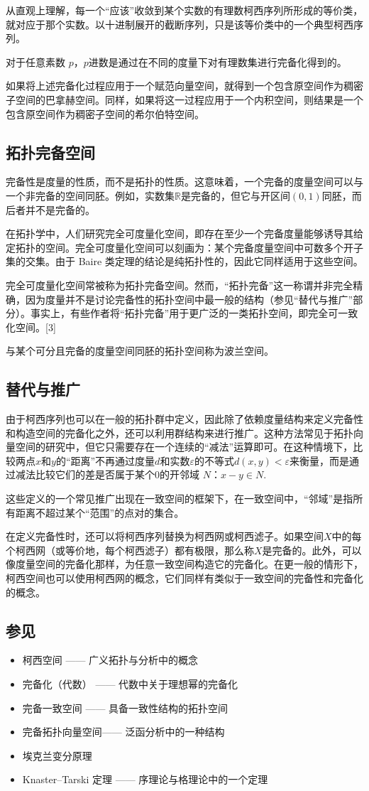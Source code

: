 从直观上理解，每一个“应该”收敛到某个实数的有理数柯西序列所形成的等价类，就对应于那个实数。以十进制展开的截断序列，只是该等价类中的一个典型柯西序列。

对于任意素数 $p$，$p$进数是通过在不同的度量下对有理数集进行完备化得到的。

如果将上述完备化过程应用于一个赋范向量空间，就得到一个包含原空间作为稠密子空间的巴拿赫空间。同样，如果将这一过程应用于一个内积空间，则结果是一个包含原空间作为稠密子空间的希尔伯特空间。
\subsection{拓扑完备空间}
完备性是度量的性质，而不是拓扑的性质。这意味着，一个完备的度量空间可以与一个非完备的空间同胚。例如，实数集$\mathbb{R}$是完备的，但它与开区间$(0,1)$同胚，而后者并不是完备的。

在拓扑学中，人们研究完全可度量化空间，即存在至少一个完备度量能够诱导其给定拓扑的空间。完全可度量化空间可以刻画为：某个完备度量空间中可数多个开子集的交集。由于 Baire 类定理的结论是纯拓扑性的，因此它同样适用于这些空间。

完全可度量化空间常被称为拓扑完备空间。然而，“拓扑完备”这一称谓并非完全精确，因为度量并不是讨论完备性的拓扑空间中最一般的结构（参见“替代与推广”部分）。事实上，有些作者将“拓扑完备”用于更广泛的一类拓扑空间，即完全可一致化空间。[3]

与某个可分且完备的度量空间同胚的拓扑空间称为波兰空间。
\subsection{替代与推广}
由于柯西序列也可以在一般的拓扑群中定义，因此除了依赖度量结构来定义完备性和构造空间的完备化之外，还可以利用群结构来进行推广。这种方法常见于拓扑向量空间的研究中，但它只需要存在一个连续的“减法”运算即可。在这种情境下，比较两点$x$和$y$的“距离”不再通过度量$d$和实数$\varepsilon$的不等式$d(x, y)<\varepsilon$来衡量，而是通过减法比较它们的差是否属于某个$0$的开邻域 $N$：$x - y \in N$.

这些定义的一个常见推广出现在一致空间的框架下，在一致空间中，“邻域”是指所有距离不超过某个“范围”的点对的集合。

在定义完备性时，还可以将柯西序列替换为柯西网或柯西滤子。如果空间$X$中的每个柯西网（或等价地，每个柯西滤子）都有极限，那么称$X$是完备的。此外，可以像度量空间的完备化那样，为任意一致空间构造它的完备化。在更一般的情形下，柯西空间也可以使用柯西网的概念，它们同样有类似于一致空间的完备性和完备化的概念。
\subsection{参见}
\begin{itemize}
\item 柯西空间 —— 广义拓扑与分析中的概念
\item 完备化（代数） —— 代数中关于理想幂的完备化
\item 完备一致空间 —— 具备一致性结构的拓扑空间
\item 完备拓扑向量空间—— 泛函分析中的一种结构
\item 埃克兰变分原理
\item Knaster–Tarski 定理 —— 序理论与格理论中的一个定理
\end{itemize}
